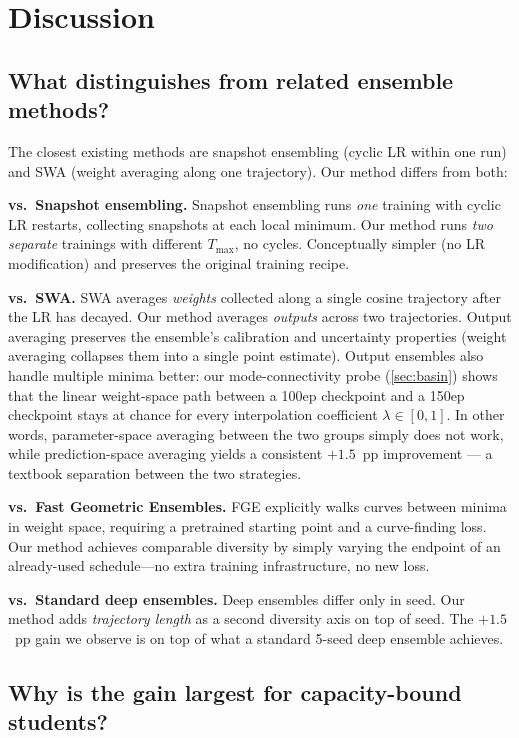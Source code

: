 \section{Discussion}
\label{sec:discussion}

\subsection{What distinguishes \ours{} from related ensemble methods?}

The closest existing methods are snapshot ensembling (cyclic LR within one
run) and SWA (weight averaging along one trajectory). Our method differs
from both:

\textbf{vs.\ Snapshot ensembling.} Snapshot ensembling runs \emph{one}
training with cyclic LR restarts, collecting snapshots at each local
minimum. Our method runs \emph{two separate} trainings with different
$T_\mathrm{max}$, no cycles. Conceptually simpler (no LR modification) and
preserves the original training recipe.

\textbf{vs.\ SWA.} SWA averages \emph{weights} collected along a single
cosine trajectory after the LR has decayed. Our method averages
\emph{outputs} across two trajectories. Output averaging preserves the
ensemble's calibration and uncertainty properties (weight averaging
collapses them into a single point estimate). Output ensembles also
handle multiple minima better: our mode-connectivity probe
(\cref{sec:basin}) shows that the linear weight-space path between a
100ep checkpoint and a 150ep checkpoint stays at chance for every
interpolation coefficient $\lambda \in [0, 1]$. In other words,
parameter-space averaging between the two groups simply does not work,
while prediction-space averaging yields a consistent $+1.5$~pp
improvement --- a textbook separation between the two strategies.

\textbf{vs.\ Fast Geometric Ensembles.} FGE explicitly walks curves
between minima in weight space, requiring a pretrained starting point and
a curve-finding loss. Our method achieves comparable diversity by simply
varying the endpoint of an already-used schedule---no extra training
infrastructure, no new loss.

\textbf{vs.\ Standard deep ensembles.} Deep ensembles differ only in seed.
Our method adds \emph{trajectory length} as a second diversity axis on
top of seed. The $+1.5$~pp gain we observe is on top of what a standard
5-seed deep ensemble achieves.

\subsection{Why is the gain largest for capacity-bound students?}

